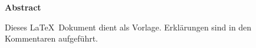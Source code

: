 
{\noindent\large\bfseries Abstract \\} 

\noindent 
Dieses \LaTeX\  Dokument dient als Vorlage. Erklärungen sind in den Kommentaren aufgeführt. 

\newpage
